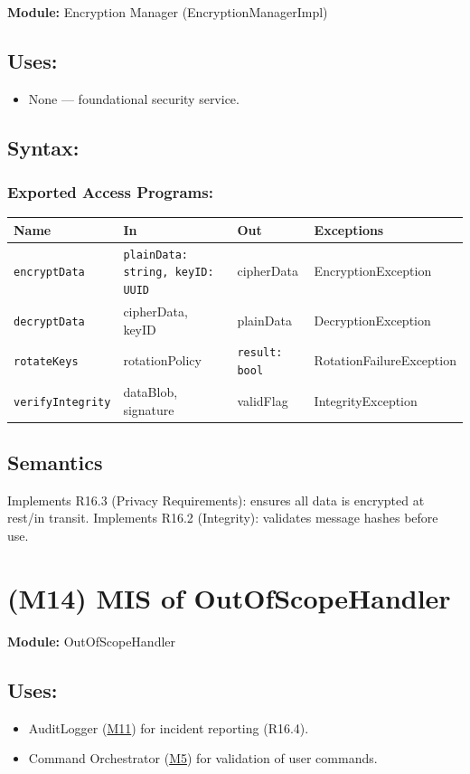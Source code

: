 \documentclass[12pt, titlepage]{article}
\begin{document}
\textbf{Module:} Encryption Manager (EncryptionManagerImpl)

\subsection{Uses:}
\begin{itemize}
\item None — foundational security service.
\end{itemize}

\subsection{Syntax:}

\subsubsection{Exported Access Programs:}

\begin{tabular}{|l|l|l|l|}
\hline
\textbf{Name} & \textbf{In} & \textbf{Out} & \textbf{Exceptions} \\ \hline
\texttt{encryptData} & \texttt{plainData: string, keyID: UUID} & cipherData & EncryptionException \\ 
\texttt{decryptData} & cipherData, keyID & plainData & DecryptionException \\ 
\texttt{rotateKeys} & rotationPolicy & \texttt{result: bool} & RotationFailureException \\ 
\texttt{verifyIntegrity} & dataBlob, signature & validFlag & IntegrityException \\ \hline
\end{tabular}

\subsection{Semantics}

Implements R16.3 (Privacy Requirements): ensures all data is encrypted at rest/in transit.
Implements R16.2 (Integrity): validates message hashes before use.


\section{(M14) MIS of OutOfScopeHandler}\label{M14}

\textbf{Module:} OutOfScopeHandler

\subsection{Uses:}
\begin{itemize}
\item AuditLogger (\hyperref[M11]{M11}) for incident reporting (R16.4).
\item Command Orchestrator (\hyperref[M5]{M5}) for validation of user commands.
\end{itemize}
\end{document}
